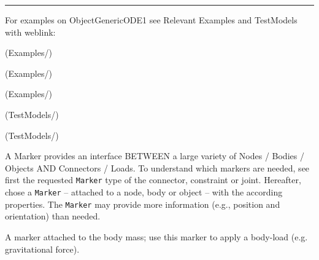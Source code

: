 \vspace{6pt}\par\noindent\rule{\textwidth}{0.4pt}
%
\noindent For examples on ObjectGenericODE1 see Relevant Examples and TestModels with weblink:
\bi
\item {} (Examples/)
\item {} (Examples/)
\item {} (Examples/)
\item {} (TestModels/)
\item {} (TestModels/)

\ei

%

\newpage
A Marker provides an interface BETWEEN a large variety of Nodes / Bodies / Objects AND Connectors / Loads. To understand which markers are needed, see first the requested \texttt{Marker} type of the connector, constraint or joint. Hereafter, chose a \texttt{Marker} -- attached to a node, body or object -- with the according properties. The \texttt{Marker} may provide more information (e.g., position and orientation) than needed.


\label{sec:item:MarkerBodyMass}
A marker attached to the body mass; use this marker to apply a body-load (e.g. gravitational force).
\vspace{12pt}\\

